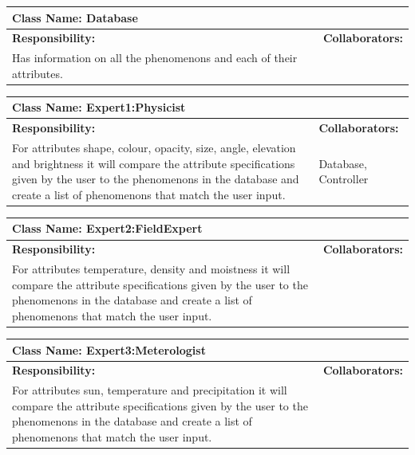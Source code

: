 \documentclass[]{article}
\begin{document}
	\begin{table}[ht]
		\centering
		\begin{tabular}{|p{5cm}|p{5cm}|}
		\hline 
		 \multicolumn{2}{|l|}{\textbf{Class Name: Database}} \\
		\hline
		\textbf{Responsibility:} & \textbf{Collaborators:} \\
		\hline
		Has information on all the phenomenons and each of their attributes. \vspace{1in} & \\
		\hline
		\end{tabular}
	\end{table}
	\begin{table}[ht]
		\centering
		\begin{tabular}{|p{5cm}|p{5cm}|}
		\hline 
		 \multicolumn{2}{|l|}{\textbf{Class Name: Expert1:Physicist}} \\
		\hline
		\textbf{Responsibility:} & \textbf{Collaborators:} \\
		\hline
		For attributes shape, colour, opacity, size, angle, elevation and brightness it will compare the attribute specifications given by the user to the phenomenons in the database and create a list of phenomenons that match the user input.  \vspace{1in} & Database, Controller \\
		\hline
		\end{tabular}
	\end{table}
	\begin{table}[ht]
		\centering
		\begin{tabular}{|p{5cm}|p{5cm}|}
		\hline 
		 \multicolumn{2}{|l|}{\textbf{Class Name: Expert2:FieldExpert}} \\
		\hline
		\textbf{Responsibility:} & \textbf{Collaborators:} \\
		\hline
		For attributes temperature, density and moistness it will compare the attribute specifications given by the user to the phenomenons in the database and create a list of phenomenons that match the user input. \vspace{1in} & \\
		\hline
		\end{tabular}
	\end{table}
	\begin{table}[ht]
		\centering
		\begin{tabular}{|p{5cm}|p{5cm}|}
		\hline 
		 \multicolumn{2}{|l|}{\textbf{Class Name: Expert3:Meterologist}} \\
		\hline
		\textbf{Responsibility:} & \textbf{Collaborators:} \\
		\hline
		For attributes sun, temperature and precipitation it will compare the attribute specifications given by the user to the phenomenons in the database and create a list of phenomenons that match the user input.\vspace{1in} & \\
		\hline
		\end{tabular}
	\end{table}
\end{document}
